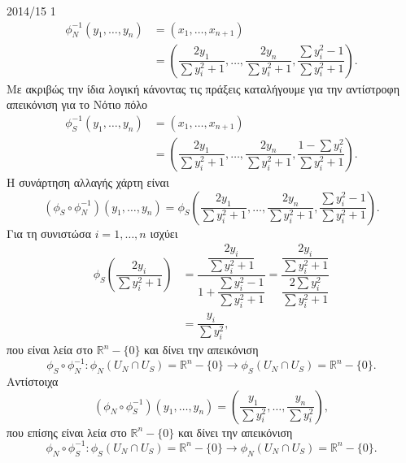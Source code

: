 \documentclass[a4paper,11pt]{article}
\begin{document}
\begin{solution}{2014/15 1}
\begin{align*}
        \phi_N^{-1}(y_1, \dots, y_n)&=(x_1, \dots, x_{n+1})\\
        &= \left( \dfrac{2y_1}{\sum y_i^2 + 1}, \dots
            ,\dfrac{2y_n}{\sum y_i^2 + 1},
        \dfrac{\sum y_i^2 - 1}{\sum y_i^2 + 1} \right).
    \end{align*}
    Με ακριβώς την ίδια λογική κάνοντας τις πράξεις καταλήγουμε για την
    αντίστροφη απεικόνιση για το Νότιο πόλο
    \begin{align*}
        \phi_S^{-1}(y_1, \dots, y_n)&=(x_1, \dots, x_{n+1})\\
        &= \left( \dfrac{2y_1}{\sum y_i^2 + 1}, \dots
            ,\dfrac{2y_n}{\sum y_i^2 + 1},
        \dfrac{1 - \sum y_i^2}{\sum y_i^2 + 1} \right).
    \end{align*}
    Η συνάρτηση αλλαγής χάρτη είναι
    \begin{equation*}
        (\phi_S \circ \phi_N^{-1}) (y_1, \dots, y_n)=
        \phi_S \left( \dfrac{2y_1}{\sum y_i^2 + 1}, \dots
            ,\dfrac{2y_n}{\sum y_i^2 + 1},
        \dfrac{\sum y_i^2 - 1}{\sum y_i^2 + 1} \right).
    \end{equation*}
    Για τη συνιστώσα \( i = 1,\dots,n \) ισχύει
    \begin{align*}
        \phi_S \left( \dfrac{2y_i}{\sum y_i^2 + 1} \right) &=
        \dfrac{\dfrac{2y_i}{\sum y_i^2 + 1}}
        {1 + \dfrac{\sum y_i^2 - 1}{\sum y_i^2 + 1}}
        = \dfrac{\dfrac{2y_i}{\sum y_i^2 + 1}}
        {\dfrac{2\sum y_i^2}{\sum y_i^2 + 1}} \\
        &= \dfrac{y_i}{\sum y_i^2},
    \end{align*}
    που είναι λεία στο \( \mathbb{R}^n - \{0\} \) και δίνει την απεικόνιση
    \begin{equation*}
        \phi_S \circ \phi_N^{-1}:\phi_N(U_N \cap U_S) = \mathbb{R}^n - \{0\} \to
        \phi_S(U_N \cap U_S) = \mathbb{R}^n - \{0\}.
    \end{equation*}
    Αντίστοιχα
    \begin{equation*}
        (\phi_N \circ \phi_S^{-1}) (y_1, \dots, y_n)=
        \left( \dfrac{y_1}{\sum y_i^2}, \dots,
        \dfrac{y_n}{\sum y_i^2}\right),
    \end{equation*}
    που επίσης είναι λεία στο \( \mathbb{R}^n - \{0\} \) και δίνει την απεικόνιση
    \begin{equation*}
        \phi_N \circ \phi_S^{-1}:\phi_S(U_N \cap U_S) = \mathbb{R}^n - \{0\} \to
        \phi_N(U_N \cap U_S) = \mathbb{R}^n - \{0\}.
    \end{equation*}
\end{solution}
\end{document}
